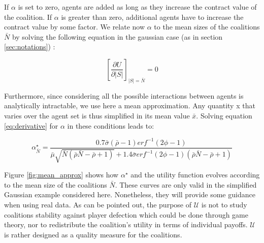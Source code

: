 \documentclass[journal]{IEEEtran}
\begin{document}
If $ \alpha $ is set to zero, agents are added as long as they increase the contract value of the coalition. If $ \alpha $ is greater than zero, additional agents have to increase the contract value by some factor. We relate now $ \alpha $ to the mean sizes of the coalitions $ \bar{N} $ by solving the following equation in the gaussian case (as in section \ref{sec:notations}) :

\begin{equation}
\left[ \dfrac{\partial{ U}}{ \partial{|S|}} \right]_{|S| = \bar{N}} = 0
\label{eq:derivative}
\end{equation}

Furthermore, since considering all the possible interactions between agents is analytically intractable, we use here a mean approximation. Any quantity x that varies over the agent set is thus simplified in its mean value $ \bar{x} $. Solving equation \ref{eq:derivative} for $ \alpha $ in these conditions leads to:

\footnotesize
\begin{equation}
\alpha^{\star}_{\bar{N}} = \dfrac{0.7 \bar{\sigma}(\bar{\rho}-1)erf^{-1}(2 \phi - 1)}{\bar{\mu}\sqrt{\bar{N}(\bar{\rho}\bar{N}-\bar{\rho}+1)}+1.4 \bar{\sigma} erf^{-1} (2 \phi -1 ) (\bar{\rho}\bar{N}-\bar{\rho} + 1)} 
\label{eq:alpha_star}
\end{equation}
\normalsize

Figure \ref{fig:mean_approx} shows how $ \alpha^{\star} $ and the utility function evolves according to the mean size of the coalitions $ \bar{N} $. These curves are only valid in the simplified Gaussian example considered here. Nonetheless, they will provide some guidance when using real data. As can be pointed out, the purpose of $ \mathcal{U} $ is not to study coalitions stability against player defection which could be done through game theory, nor to redistribute the coalition's utility in terms of individual payoffs. $ \mathcal{U} $ is rather designed as a quality measure for the coalitions.
\end{document}
